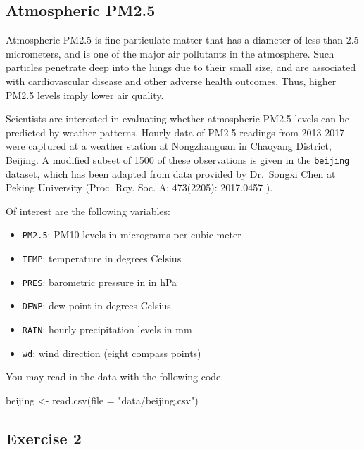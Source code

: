\documentclass[
  letterpaper,
  DIV=11,
  numbers=noendperiod]{scrartcl}
\newenvironment{Shaded}{\begin{snugshade}}{\end{snugshade}}
\newcommand{\AttributeTok}[1]{\textcolor[rgb]{0.40,0.45,0.13}{#1}}
\newcommand{\FunctionTok}[1]{\textcolor[rgb]{0.28,0.35,0.67}{#1}}
\newcommand{\NormalTok}[1]{\textcolor[rgb]{0.00,0.23,0.31}{#1}}
\newcommand{\OtherTok}[1]{\textcolor[rgb]{0.00,0.23,0.31}{#1}}
\newcommand{\StringTok}[1]{\textcolor[rgb]{0.13,0.47,0.30}{#1}}
\providecommand{\tightlist}{%
  \setlength{\itemsep}{0pt}\setlength{\parskip}{0pt}}
\begin{document}
\subsection{Atmospheric PM2.5}\label{atmospheric-pm2.5}

Atmospheric PM2.5 is fine particulate matter that has a diameter of less
than 2.5 micrometers, and is one of the major air pollutants in the
atmosphere. Such particles penetrate deep into the lungs due to their
small size, and are associated with cardiovascular disease and other
adverse health outcomes. Thus, higher PM2.5 levels imply lower air
quality.

Scientists are interested in evaluating whether atmospheric PM2.5 levels
can be predicted by weather patterns. Hourly data of PM2.5 readings from
2013-2017 were captured at a weather station at Nongzhanguan in Chaoyang
District, Beijing. A modified subset of 1500 of these observations is
given in the \texttt{beijing} dataset, which has been adapted from data
provided by Dr.~Songxi Chen at Peking University (Proc. Roy. Soc. A:
473(2205): 2017.0457 ).

Of interest are the following variables:

\begin{itemize}
\tightlist
\item
  \texttt{PM2.5}: PM10 levels in micrograms per cubic meter
\item
  \texttt{TEMP}: temperature in degrees Celsius
\item
  \texttt{PRES}: barometric pressure in in hPa
\item
  \texttt{DEWP}: dew point in degrees Celsius
\item
  \texttt{RAIN}: hourly precipitation levels in mm
\item
  \texttt{wd}: wind direction (eight compass points)
\end{itemize}

You may read in the data with the following code.

\begin{Shaded}
\begin{Highlighting}[]
\NormalTok{beijing }\OtherTok{\textless{}{-}} \FunctionTok{read.csv}\NormalTok{(}\AttributeTok{file =} \StringTok{"data/beijing.csv"}\NormalTok{)}
\end{Highlighting}
\end{Shaded}

\subsection{Exercise 2}\label{exercise-2}
\end{document}
